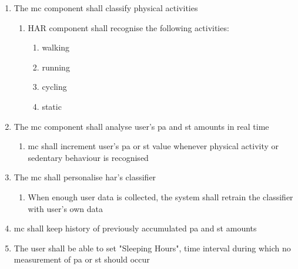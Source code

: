     \begin{enumerate}
        \item The \gls{mc} component shall classify physical activities
        \begin{enumerate}
            \item HAR component shall recognise the following activities:
            \begin{enumerate}
                \item walking
                \item running
                \item cycling
                \item static
            \end{enumerate}
        \end{enumerate}
        \item The \gls{mc} component shall analyse user's \gls{pa} and \gls{st} amounts in real time
            \begin{enumerate}
                \item \gls{mc} shall increment user's \gls{pa} or \gls{st} value whenever physical activity or sedentary behaviour is recognised
            \end{enumerate}
        \item The \gls{mc} shall personalise \gls{har}'s classifier
            \begin{enumerate}
                \item When enough user data is collected, the system shall retrain the classifier with user's own data
            \end{enumerate}
            
        \item \gls{mc} shall keep history of previously accumulated \gls{pa} and \gls{st} amounts
        
        \item The user shall be able to set "Sleeping Hours", time interval during which no measurement of \gls{pa} or \gls{st} should occur
      
    \end{enumerate}
    
